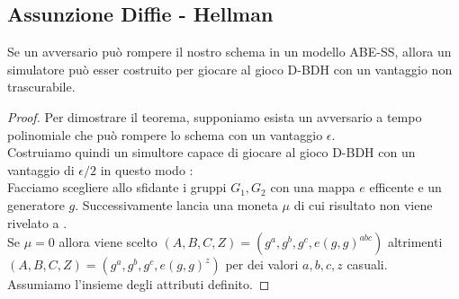
\subsection{Assunzione Diffie - Hellman}

\begin{thm}
Se un avversario può rompere il nostro schema in un modello ABE-SS, allora un simulatore può esser costruito per giocare al gioco D-BDH con un vantaggio non trascurabile.
\begin{proof}
Per dimostrare il teorema, supponiamo esista un avversario  a tempo polinomiale che può rompere lo schema con un vantaggio $\epsilon$.\\
Costruiamo quindi un simultore  capace di giocare al gioco D-BDH con un vantaggio di $\epsilon / 2$ in questo modo :\\
Facciamo scegliere allo sfidante i gruppi $G_1, G_2$ con una mappa $e$ efficente e un generatore $g$. Successivamente lancia una moneta $\mu$ di cui risultato non viene rivelato a .\\
Se $ \mu = 0$ allora viene scelto $(A,B,C,Z) = (g^a,g^b,g^c,e(g,g)^{abc})$ altrimenti $(A,B,C,Z) = (g^a,g^b,g^c, e(g,g)^z)$ per dei valori $a,b,c,z$ casuali.\\
Assumiamo l'insieme degli attributi  definito.


\end{proof}
\end{thm}
